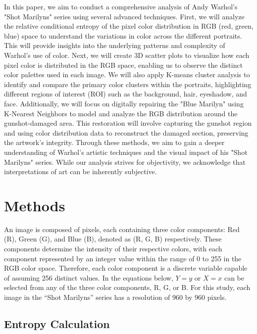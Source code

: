 \documentclass{article}
\begin{document}
In this paper, we aim to conduct a comprehensive analysis of Andy Warhol's "Shot Marilyns" series using several advanced techniques. First, we will analyze the relative conditional entropy of the pixel color distribution in RGB (red, green, blue) space to understand the variations in color across the different portraits. This will provide insights into the underlying patterns and complexity of Warhol’s use of color. Next, we will create 3D scatter plots to visualize how each pixel color is distributed in the RGB space, enabling us to observe the distinct color palettes used in each image. We will also apply K-means cluster analysis to identify and compare the primary color clusters within the portraits, highlighting different regions of interest (ROI) such as the background, hair, eyeshadow, and face. Additionally, we will focus on digitally repairing the "Blue Marilyn" using K-Nearest Neighbors to model and analyze the RGB distribution around the gunshot-damaged area. This restoration will involve capturing the gunshot region and using color distribution data to reconstruct the damaged section, preserving the artwork's integrity. Through these methods, we aim to gain a deeper understanding of Warhol's artistic techniques and the visual impact of his "Shot Marilyns" series. While our analysis strives for objectivity, we acknowledge that interpretations of art can be inherently subjective.

\hypertarget{methods}{%
\section{Methods}\label{methods}}

An image is composed of pixels, each containing three color components:
Red (R), Green (G), and Blue (B), denoted as (R, G, B) respectively.
These components determine the intensity of their respective colors,
with each component represented by an integer value within the range of
0 to 255 in the RGB color space. Therefore, each color component is a
discrete variable capable of assuming 256 distinct values. In the
equations below, \(Y=y\) or \(X=x\) can be selected from any of the
three color components, R, G, or B. For this study, each image in the
``Shot Marilyns'' series has a resolution of 960 by 960 pixels.

\hypertarget{entropy-calculation}{%
\subsection{Entropy Calculation}\label{entropy-calculation}}
\end{document}
